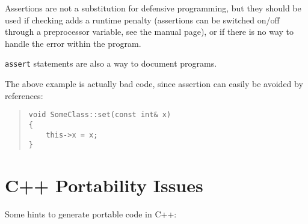 \begin{notes}

  \item Assertions are not a substitution for defensive programming, but 
  they should be used if checking adds a runtime penalty (assertions can 
  be switched on/off through a preprocessor variable, see the manual 
  page), or if there is no way to handle the error within the program.

  \item \texttt{assert} statements are also a way to document programs.

  \item The above example is actually bad code, since assertion can 
  easily be avoided by references:

\begin{quote}
\begin{verbatim}
void SomeClass::set(const int& x)
{
    this->x = x;
}
\end{verbatim}
\end{quote}

\end{notes}


%
%

\section{C++ Portability Issues}

Some hints to generate portable code in C++:

